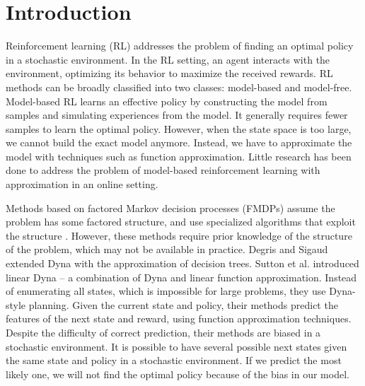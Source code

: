 

\chapter{Introduction}
\label{ch:intro}

Reinforcement learning (RL) addresses the problem of finding an optimal policy in a stochastic environment.
In the RL setting, an agent interacts with the environment, optimizing its behavior to
maximize the received rewards.
RL methods can be broadly classified into two classes: model-based and
model-free. Model-based RL learns an effective policy by
constructing the model from samples and simulating experiences from the model. It
generally requires fewer samples to learn the optimal policy. However, when the
state space is too large, we cannot build the exact model anymore. Instead, we
have to approximate the model with techniques such as function approximation. Little 
research has been done to address the problem of model-based reinforcement learning with approximation in
an online setting.

Methods based on factored Markov decision processes (FMDPs) assume the problem has some factored structure, and use 
specialized algorithms that exploit the structure \cite{ApproxFactor} \cite{SPUDD}. 
However, these methods require prior knowledge
of the structure of the problem, which may not be available in practice.
Degris and Sigaud \cite{ApproxTree} extended Dyna \cite{Dyna} with the approximation of decision trees.
Sutton et al. \cite{ApproxDyna} introduced linear Dyna -- a combination 
of Dyna and linear function approximation. 
Instead of enumerating all states, which is impossible for large problems, they
use Dyna-style planning. Given the current state and policy, 
their methods predict the features of the next state and reward, using function approximation
techniques. Despite the difficulty of correct prediction, their methods are biased 
in a stochastic environment. It is possible to have
several possible next states given the same state and policy in a stochastic environment.
If we predict the most likely one, we will not find the optimal policy because of the bias in our model.


